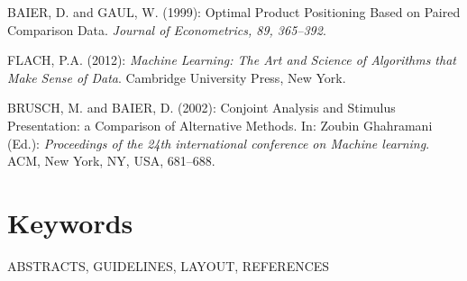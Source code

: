 \documentclass{svmult}
\begin{document}
\begin{thebibliography}{1}

\item[]
BAIER, D. and GAUL, W. (1999): Optimal Product Positioning Based on
Paired Comparison Data. {\em Journal of Econometrics, 89, 365--392}.

\item[]
FLACH, P.A. (2012): {\em Machine Learning: The Art and Science of Algorithms that Make Sense of Data}. Cambridge University Press, New York.

\item[]
BRUSCH, M. and BAIER, D. (2002): Conjoint Analysis and Stimulus
Presentation: a Comparison of Alternative Methods. In: Zoubin Ghahramani (Ed.): {\em Proceedings of the 24th international conference on Machine learning}. ACM, New York, NY, USA, 681--688.

\end{thebibliography}

\section*{Keywords}
ABSTRACTS, GUIDELINES, LAYOUT, REFERENCES
\end{document}
